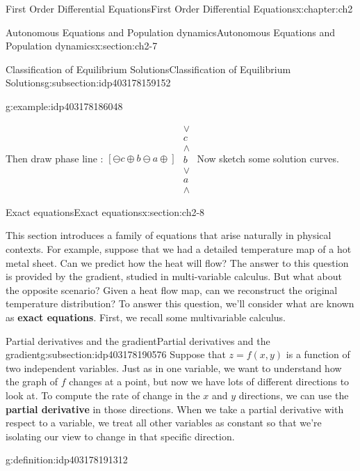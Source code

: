 \documentclass[oneside,10pt,]{book}
\newcommand{\terminology}[1]{\textbf{#1}}
\numberwithin{equation}{section}
\numberwithin{equation}{section}
\begin{document}
\begin{chapterptx}{First Order Differential Equations}{}{First Order Differential Equations}{}{}{x:chapter:ch2}
\begin{sectionptx}{Autonomous Equations and Population dynamics}{}{Autonomous Equations and Population dynamics}{}{}{x:section:ch2-7}
\begin{subsectionptx}{Classification of Equilibrium Solutions}{}{Classification of Equilibrium Solutions}{}{}{g:subsection:idp403178159152}
\begin{example}{}{g:example:idp403178186048}
\begin{image}{0}{1}{0}
\end{image}%
 Then draw phase line : \(\left[\ominus c\oplus b\ominus a\oplus\right]\) \(\begin{array}{c}
\vee\\
c\\
\wedge\\
b\\
\vee\\
a\\
\wedge
\end{array}\) Now sketch some solution curves.%
%
\end{example}
\end{subsectionptx}
\end{sectionptx}
%
%
\typeout{************************************************}
\typeout{************************************************}
%
\begin{sectionptx}{Exact equations}{}{Exact equations}{}{}{x:section:ch2-8}
\begin{introduction}{}%
This section introduces a family of equations that arise naturally in physical contexts. For example, suppose that we had a detailed temperature map of a hot metal sheet. Can we predict how the heat will flow? The answer to this question is provided by the gradient, studied in multi-variable calculus. But what about the opposite scenario? Given a heat flow map, can we reconstruct the original temperature distribution? To answer this question, we'll consider what are known as \terminology{exact equations}. First, we recall some multivariable calculus.%
\end{introduction}%
%
%
\typeout{************************************************}
\typeout{************************************************}
%
\begin{subsectionptx}{Partial derivatives and the gradient}{}{Partial derivatives and the gradient}{}{}{g:subsection:idp403178190576}
Suppose that \(z = f(x,y)\) is a function of two independent variables. Just as in one variable, we want to understand how the graph of \(f\) changes at a point, but now we have lots of different directions to look at. To compute the rate of change in the \(x\) and \(y\) directions, we can use the \terminology{partial derivative} in those directions. When we take a partial derivative with respect to a variable, we treat all other variables as constant so that we're isolating our view to change in that specific direction.%
\begin{definition}{}{g:definition:idp403178191312}%

\end{definition}
\end{subsectionptx}
\end{sectionptx}
\end{chapterptx}
\end{document}

